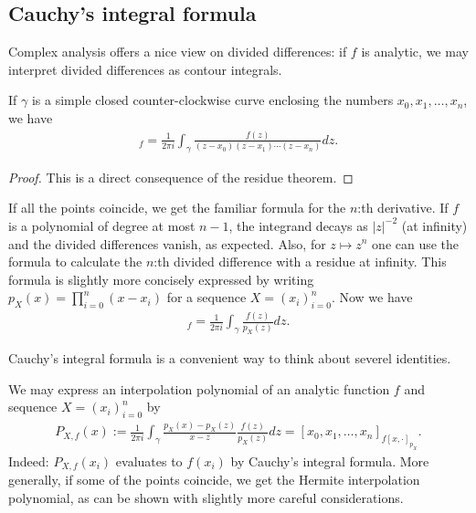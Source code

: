 \subsection{Cauchy's integral formula}

Complex analysis offers a nice view on divided differences: if $f$ is analytic, we may interpret divided differences as contour integrals.

\begin{lem}\label{div_cauchy}
If $\gamma$ is a simple closed counter-clockwise curve enclosing the numbers $x_{0}, x_{1}, \ldots, x_{n}$, we have
\begin{align*}
	[x_{0}, x_{1}, \ldots, x_{n}]_{f} = \frac{1}{2 \pi i} \int_{\gamma} \frac{f(z)}{(z - x_{0})(z - x_{1}) \cdots (z - x_{n})} dz.
\end{align*}
\end{lem}
\begin{proof}
	This is a direct consequence of the residue theorem.
\end{proof}

If all the points coincide, we get the familiar formula for the $n$:th derivative. If $f$ is a polynomial of degree at most $n - 1$, the integrand decays as $|z|^{-2}$ (at infinity) and the divided differences vanish, as expected. Also, for $z \mapsto z^{n}$ one can use the formula to calculate the $n$:th divided difference with a residue at infinity. This formula is slightly more concisely expressed by writing $p_{X}(x) = \prod_{i = 0}^{n} (x - x_{i})$ for a sequence $X = (x_{i})_{i = 0}^{n}$. Now we have
\begin{align*}
	[x_{0}, x_{1}, \ldots, x_{n}]_{f} = \frac{1}{2 \pi i} \int_{\gamma} \frac{f(z)}{p_{X}(z)} dz.
\end{align*}

Cauchy's integral formula is a convenient way to think about severel identities.

\begin{esim}
We may express an interpolation polynomial of an analytic function $f$ and sequence $X = (x_{i})_{i = 0}^{n}$ by
\begin{align*}
	P_{X, f}(x) := \frac{1}{2 \pi i} \int_{\gamma} \frac{p_{X}(x) - p_{X}(z)}{x - z}\frac{f(z)}{p_{X}(z)} dz = [x_{0}, x_{1}, \ldots, x_{n}]_{f [x, \cdot]_{p_{X}}}.
\end{align*}
Indeed: $P_{X, f}(x_{i})$ evaluates to $f(x_{i})$ by Cauchy's integral formula. More generally, if some of the points coincide, we get the Hermite interpolation polynomial, as can be shown with slightly more careful considerations.
\end{esim}

